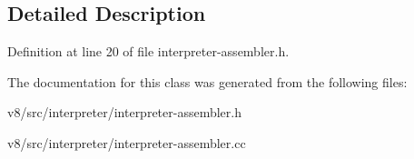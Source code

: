 \subsection{Detailed Description}


Definition at line 20 of file interpreter-\/assembler.\+h.



The documentation for this class was generated from the following files\+:\begin{DoxyCompactItemize}
\item 
v8/src/interpreter/interpreter-\/assembler.\+h\item 
v8/src/interpreter/interpreter-\/assembler.\+cc\end{DoxyCompactItemize}
